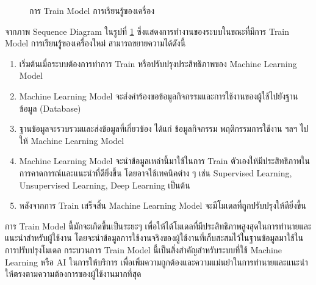 \documentclass[14pt,oneside,openright,a4paper]{cpe-thai-project}
\begin{document}
  \begin{figure}[!h]\centering
    \setlength{\fboxrule}{0.5mm} %
    \setlength{\fboxsep}{0.5cm}
    \caption{การ Train Model การเรียนรู้ของเครื่อง}\label{fig:Machine learning training}
  \end{figure}
  
  จากภาพ Sequence Diagram ในรูปที่ \ref{fig:Machine learning training} ซึ่งแสดงการทำงานของระบบในขณะที่มีการ Train Model การเรียนรู้ของเครื่องใหม่ สามารถขยายความได้ดังนี้
  \begin{enumerate}
    \item เริ่มต้นเมื่อระบบต้องการทำการ Train หรือปรับปรุงประสิทธิภาพของ Machine Learning Model
    \item Machine Learning Model จะส่งคำร้องขอข้อมูลกิจกรรมและการใช้งานของผู้ใช้ไปยังฐานข้อมูล (Database)
    \item ฐานข้อมูลจะรวบรวมและส่งข้อมูลที่เกี่ยวข้อง ได้แก่ ข้อมูลกิจกรรม พฤติกรรมการใช้งาน ฯลฯ ไปให้ Machine Learning Model
    \item Machine Learning Model จะนำข้อมูลเหล่านี้มาใช้ในการ Train ตัวเองให้มีประสิทธิภาพในการคาดการณ์และแนะนำที่ดียิ่งขึ้น โดยอาจใช้เทคนิคต่าง ๆ เช่น Supervised Learning, Unsupervised Learning, Deep Learning เป็นต้น
    \item หลังจากการ Train เสร็จสิ้น Machine Learning Model จะมีโมเดลที่ถูกปรับปรุงให้ดียิ่งขึ้น
  \end{enumerate}
  การ Train Model นี้มักจะเกิดขึ้นเป็นระยะๆ เพื่อให้ได้โมเดลที่มีประสิทธิภาพสูงสุดในการทำนายและแนะนำสำหรับผู้ใช้งาน โดยจะนำข้อมูลการใช้งานจริงของผู้ใช้งานที่เก็บสะสมไว้ในฐานข้อมูลมาใช้ในการปรับปรุงโมเดล
กระบวนการ Train Model นี้เป็นสิ่งสำคัญสำหรับระบบที่ใช้ Machine Learning หรือ AI ในการให้บริการ เพื่อเพิ่มความถูกต้องและความแม่นยำในการทำนายและแนะนำให้ตรงตามความต้องการของผู้ใช้งานมากที่สุด
\newpage
\end{document}
